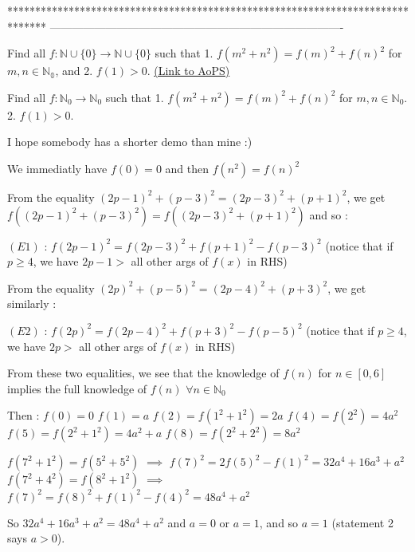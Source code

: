 *******************************************************************************
-------------------------------------------------------------------------------

\begin{problem}
	Find all $ f: \mathbb{N} \cup \{0\} \to \mathbb{N} \cup \{0\}$ such that
1. $ f(m^2+n^2)=f(m)^2+f(n)^2$ for $ m,n \in \mathbb{N_0}$, and
2. $ f(1)> 0$.
	\flushright \href{https://artofproblemsolving.com/community/c6h272002}{(Link to AoPS)}
\end{problem}



\begin{solution}
	\begin{tcolorbox}Find all $ f: \mathbb{N}_0 \to \mathbb{N}_0$ such that
1. $ f(m^2 + n^2) = f(m)^2 + f(n)^2$ for $ m,n \in \mathbb{N}_0$.
2. $ f(1) > 0$.\end{tcolorbox}

I hope somebody has a shorter demo than mine :)

We immediatly have $ f(0)=0$ and then $ f(n^2)=f(n)^2$

From the equality $ (2p-1)^2 + (p-3)^2 = (2p-3)^2 + (p+1)^2$, we get $ f((2p-1)^2+(p-3)^2)=f((2p-3)^2+(p+1)^2)$ and so :

$ (E1)$ : $ f(2p-1)^2 = f(2p-3)^2 + f(p+1)^2 - f(p-3)^2$ (notice that if $ p\geq 4$, we have $ 2p-1>$ all other args of $ f(x)$ in RHS)

From the equality $ (2p)^2 + (p-5)^2 = (2p-4)^2 + (p+3)^2$, we get similarly :

$ (E2)$ : $ f(2p)^2 = f(2p-4)^2 + f(p+3)^2 - f(p-5)^2$ (notice that if $ p\geq 4$, we have $ 2p>$ all other args of $ f(x)$ in RHS)

From these two equalities, we see that the knowledge of $ f(n)$ for $ n\in[0,6]$ implies the full knowledge of $ f(n)$ $ \forall n\in\mathbb{N}_0$

Then :
$ f(0)=0$
$ f(1)=a$
$ f(2)=f(1^2+1^2)=2a$
$ f(4)=f(2^2)=4a^2$
$ f(5)=f(2^2+1^2)=4a^2+a$
$ f(8)=f(2^2+2^2)=8a^2$

$ f(7^2+1^2)=f(5^2+5^2)$ $ \implies$ $ f(7)^2=2f(5)^2-f(1)^2 = 32a^4+16a^3+a^2$
$ f(7^2+4^2)=f(8^2+1^2)$ $ \implies$ $ f(7)^2=f(8)^2+f(1)^2-f(4)^2=48a^4+a^2$

So $ 32a^4+16a^3+a^2=48a^4+a^2$ and $ a=0$ or $ a=1$, and so $ a=1$ (statement 2 says $ a>0$).


\end{solution}
